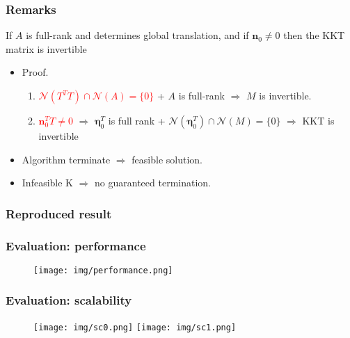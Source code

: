 \documentclass[serif,mathserif]{beamer}
\newcommand{\BOLD}[1]{\mathbf{#1}}
\newcommand{\BOLDG}[1]{\boldsymbol{#1}}
\newcommand{\TODO}[1]{\textcolor{red}{#1}}
\begin{document}
\begin{frame}
 \frametitle{Remarks}
  \begin{theo}
    If $A$ is full-rank and determines global translation, and if $\BOLD{n}_0 \neq 0$ then the KKT matrix is invertible
  \end{theo}
  \begin{itemize}
    \item Proof. 
    \begin{enumerate}
     \item \TODO{$\mathcal{N}(T^TT) \cap \mathcal{N}(A) = \{0\}$} + $A$ is full-rank $\Rightarrow$ $M$ is invertible.
     \item \TODO{$\BOLD{n}_0^TT \neq 0$} $\Rightarrow$ $\BOLDG{\eta}^T_0$ is full rank + $\mathcal{N}(\BOLDG{\eta}_0^T) \cap \mathcal{N}(M) = \{0\}$
     $\Rightarrow$ KKT is invertible
    \end{enumerate}
  \end{itemize}
  \begin{itemize}
   \item Algorithm terminate $\Rightarrow$ feasible solution.
   \item Infeasible K $\Rightarrow$ no guaranteed termination.
  \end{itemize}
\end{frame}

\begin{frame}
 \frametitle{Reproduced result}
\end{frame}

\begin{frame}
 \frametitle{Evaluation: performance}
 \begin{figure}
  \centering
  \texttt{[image: img/performance.png]}
 \end{figure}
\end{frame}

\begin{frame}
 \frametitle{Evaluation: scalability}
 \begin{figure}[t]
  \centering  
  \begin{minipage}[t][0.9\textheight][s]{1\textwidth}
    \centering
    \texttt{[image: img/sc0.png]} 
    \vfill
    \texttt{[image: img/sc1.png]}
  \end{minipage}
 \end{figure}
\end{frame}
\end{document}
